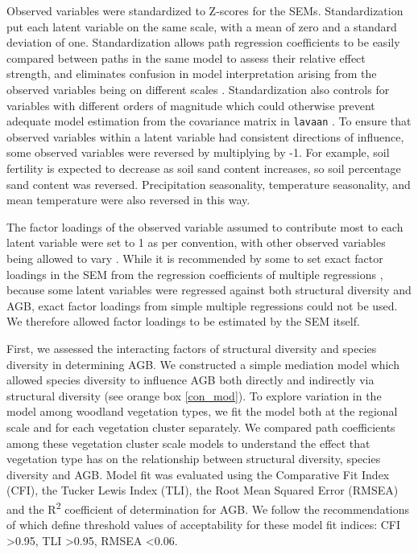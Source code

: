 \documentclass[11pt,a4paper]{article}
\begin{document}
Observed variables were standardized to Z-scores for the SEMs. Standardization put each latent variable on the same scale, with a mean of zero and a standard deviation of one. Standardization allows path regression coefficients to be easily compared between paths in the same model to assess their relative effect strength, and eliminates confusion in model interpretation arising from the observed variables being on different scales \citep{}. Standardization also controls for variables with different orders of magnitude which could otherwise prevent adequate model estimation from the covariance matrix in \verb|lavaan| \citep{}. To ensure that observed variables within a latent variable had consistent directions of influence, some observed variables were reversed by multiplying by -1. For example, soil fertility is expected to decrease as soil sand content increases, so soil percentage sand content was reversed. Precipitation seasonality, temperature seasonality, and mean temperature were also reversed in this way.

The factor loadings of the observed variable assumed to contribute most to each latent variable were set to 1 as per convention, with other observed variables being allowed to vary \citep{}. While it is recommended by some to set exact factor loadings in the SEM from the regression coefficients of multiple regressions \citep{}, because some latent variables were regressed against both structural diversity and AGB, exact factor loadings from simple multiple regressions could not be used. We therefore allowed factor loadings to be estimated by the SEM itself.

First, we assessed the interacting factors of structural diversity and species diversity in determining AGB. We constructed a simple mediation model which allowed species diversity to influence AGB both directly and indirectly via structural diversity (see orange box \autoref{con_mod}). To explore variation in the model among woodland vegetation types, we fit the model both at the regional scale and for each vegetation cluster separately. We compared path coefficients among these vegetation cluster scale models to understand the effect that vegetation type has on the relationship between structural diversity, species diversity and AGB. Model fit was evaluated using the Comparative Fit Index (CFI), the Tucker Lewis Index (TLI), the Root Mean Squared Error (RMSEA) and the R\textsuperscript{2} coefficient of determination for AGB. We follow the recommendations of \citet{Hu1999} which define threshold values of acceptability for these model fit indices: CFI >0.95, TLI >0.95, RMSEA <0.06.
\end{document}
